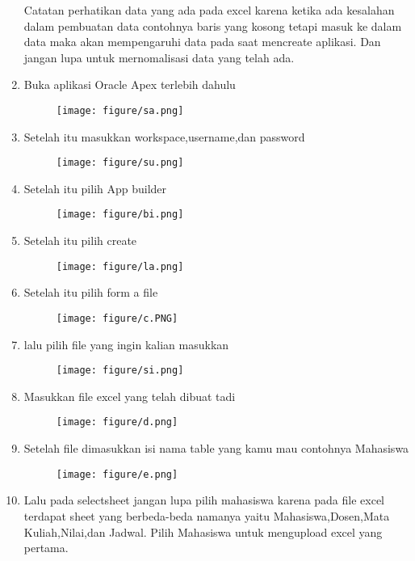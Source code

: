 \documentclass{article}
\begin{document}
\begin{enumerate}
\newpage \par Catatan perhatikan data yang ada pada excel karena ketika ada kesalahan dalam pembuatan data contohnya baris yang kosong tetapi masuk ke dalam data maka akan mempengaruhi data pada saat mencreate aplikasi. Dan jangan lupa untuk mernomalisasi data yang telah ada. 
\item Buka aplikasi Oracle Apex terlebih dahulu
 \begin{figure}[h]	
 \centerline{\texttt{[image: figure/sa.png]}}
    \end{figure}
     \item Setelah itu masukkan workspace,username,dan password
         \begin{figure}[h]
    \centerline{\texttt{[image: figure/su.png]}}
       \end{figure}
\newpage \item Setelah itu pilih App builder
    \begin{figure}[h]
    \centerline{\texttt{[image: figure/bi.png]}}
\end{figure}
  \item Setelah itu pilih create
    \begin{figure}[h]
  \centerline{\texttt{[image: figure/la.png]}}
\end{figure}
     \item Setelah itu pilih form a file
    \begin{figure}[h]
   \centerline{\texttt{[image: figure/c.PNG]}}
   \end{figure}
\newpage\item lalu pilih file yang ingin kalian masukkan
    \begin{figure}[h]
   \centerline{\texttt{[image: figure/si.png]}}
\end{figure}
\item Masukkan file excel yang telah dibuat tadi
\begin{figure}[h]
   \centerline{\texttt{[image: figure/d.png]}}
\end{figure}
\newpage \item Setelah file dimasukkan isi nama table yang kamu mau contohnya  Mahasiswa
\begin{figure}[h]
\centerline{\texttt{[image: figure/e.png]}}
\end{figure}
\item Lalu pada selectsheet jangan lupa pilih mahasiswa karena pada file excel terdapat sheet yang berbeda-beda namanya yaitu Mahasiswa,Dosen,Mata Kuliah,Nilai,dan Jadwal. Pilih Mahasiswa untuk mengupload excel yang pertama.

\end{enumerate}
\end{document}
